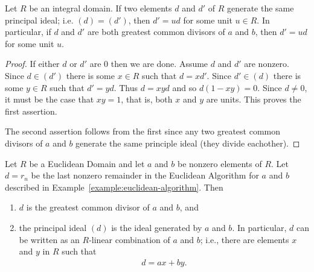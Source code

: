     \begin{proposition}
        Let $R$ be an integral domain. If two elements $d$ and $d'$ of $R$ generate the same principal ideal; i.e. $(d) = (d')$, then $d' = ud$ for some unit $u \in R$. In particular, if $d$ and $d'$ are both greatest common divisors of $a$ and $b$, then $d' = ud$ for some unit $u$.
    \end{proposition}
        \begin{proof}
            If either $d$ or $d'$ are $0$ then we are done. Assume $d$ and $d'$ are nonzero. Since $d \in (d')$ there is some $x \in R$ such that $d = xd'$. Since $d' \in (d)$ there is some $y \in R$ such that $d' = yd$. Thus $d = xyd$ and so $d(1-xy) = 0$. Since $d \neq 0$, it must be the case that $xy = 1$, that is, both $x$ and $y$ are units. This proves the first assertion.

            The second assertion follows from the first since any two greatest common divisors of $a$ and $b$ generate the same principle ideal (they divide eachother).
        \end{proof}
    \newpage
    \begin{theorem}
        Let $R$ be a Euclidean Domain and let $a$ and $b$ be nonzero elements of $R$. Let $d = r_n$ be the last nonzero remainder in the Euclidean Algorithm for $a$ and $b$ described in Example~\ref{example:euclidean-algorithm}. Then
            \begin{enumerate}[label = (\arabic*)]
                \item $d$ is the greatest common divisor of $a$ and $b$, and 
                \item the principal ideal $(d)$ is the ideal generated by $a$ and $b$. In particular, $d$ can be written as an $R$-linear combination of $a$ and $b$; i.e., there are elements $x$ and $y$ in $R$ such that
                    \begin{equation*}
                    \begin{split}
                        d = ax + by.
                    \end{split}
                    \end{equation*}
            \end{enumerate}
    \end{theorem}
